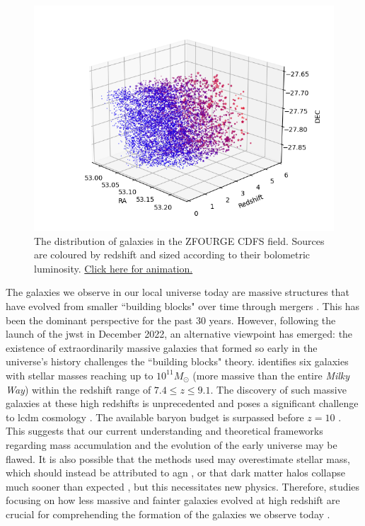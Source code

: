 \begin{figure}[b!]
    \centering
    \includegraphics[width=\linewidth]{Figures/CDFS.png}
    \caption{The distribution of galaxies in the ZFOURGE CDFS field. Sources are coloured by redshift and sized according to their bolometric luminosity. \href{https://www.youtube.com/watch?v=kTXSLjLGoNM}{Click here for animation.}}
    \label{Fig: Animation}
\end{figure}

The galaxies we observe in our local universe today are massive structures that have evolved from smaller ``building blocks" over time through mergers \citep{magorrian_demography_1998, ziparo_primordial_2024}. This has been the dominant perspective for the past 30 years. However, following the launch of the \gls{jwst} in December 2022, an alternative viewpoint has emerged: the existence of extraordinarily massive galaxies that formed so early in the universe's history challenges the ``building blocks" theory. \cite{labbe_population_2023} identifies six galaxies with stellar masses reaching up to $10^{11} M_{\odot}$ (more massive than the entire \textit{Milky Way}) within the redshift range of $7.4 \leq z \leq 9.1$. The discovery of such massive galaxies at these high redshifts is unprecedented and poses a significant challenge to \gls{lcdm} cosmology \citep{behroozi_most_2018, labbe_population_2023, greene_uncover_2024, bezanson_jwst_2024}. The available baryon budget is surpassed before $z=10$ \citep{menci_high-redshift_2022, boylan-kolchin_stress_2023}. This suggests that our current understanding and theoretical frameworks regarding mass accumulation and the evolution of the early universe may be flawed. It is also possible that the methods used may overestimate stellar mass, which should instead be attributed to \gls{agn} \citep{labbe_population_2023}, or that dark matter halos collapse much sooner than expected \citep{steinhardt_impossibly_2016}, but this necessitates new physics. Therefore, studies focusing on how less massive and fainter galaxies evolved at high redshift are crucial for comprehending the formation of the galaxies we observe today \citep{adams_discovery_2023, matthee_little_2024}.

